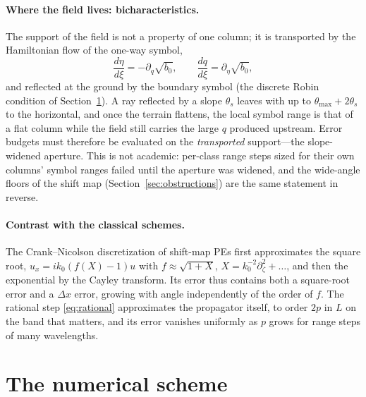 \documentclass[11pt]{article}
\newcommand{\pd}{\partial}
\begin{document}
\paragraph{Where the field lives: bicharacteristics.} The support of the field
is not a property of one column; it is transported by the Hamiltonian flow of
the one-way symbol,
\begin{equation}\label{eq:rays}
\frac{d\eta}{d\xi}=-\pd_q\sqrt{b_0},\qquad
\frac{dq}{d\xi}=\pd_\eta\sqrt{b_0},
\end{equation}
and reflected at the ground by the boundary symbol (the discrete Robin
condition of Section~\ref{sec:scheme}). A ray reflected by a slope
$\theta_s$ leaves with up to $\theta_{\max}+2\theta_s$ to the horizontal, and
once the terrain flattens, the local symbol range is that of a flat column
while the field still carries the large $q$ produced upstream. Error budgets
must therefore be evaluated on the \emph{transported} support---the
slope-widened aperture. This is not academic: per-class range steps sized for
their own columns' symbol ranges failed until the aperture was widened, and
the wide-angle floors of the shift map (Section~\ref{sec:obstructions}) are
the same statement in reverse.

\paragraph{Contrast with the classical schemes.} The Crank--Nicolson
discretization of shift-map PEs first approximates the square root,
$u_x=ik_0(f(X)-1)u$ with $f\approx\sqrt{1+X}$, $X=k_0^{-2}\pd_\zeta^2+\dots$,
and then the exponential by the Cayley transform. Its error thus contains
both a square-root error and a $\Delta x$ error, growing with angle
independently of the order of $f$. The rational step \eqref{eq:rational}
approximates the propagator itself, to order $2p$ in $L$ on the band that
matters, and its error vanishes uniformly as $p$ grows for range steps of
many wavelengths.

\section{The numerical scheme}\label{sec:scheme}
\end{document}
